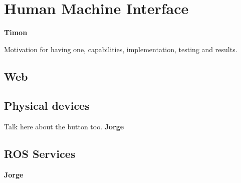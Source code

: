 \section{Human Machine Interface} %
\label{sec:mr_human_machine_interface}

\textbf{Timon}

Motivation for having one, capabilities, implementation, testing and results.

	\subsection{Web} %
	\label{sub:mr_web}


	\subsection{Physical devices} %
	\label{sub:mr_physical_devices}
	Talk here about the button too.
	\textbf{Jorge}

	\subsection{ROS Services} %
	\label{sub:mr_ros_services}
	\textbf{Jorge}

